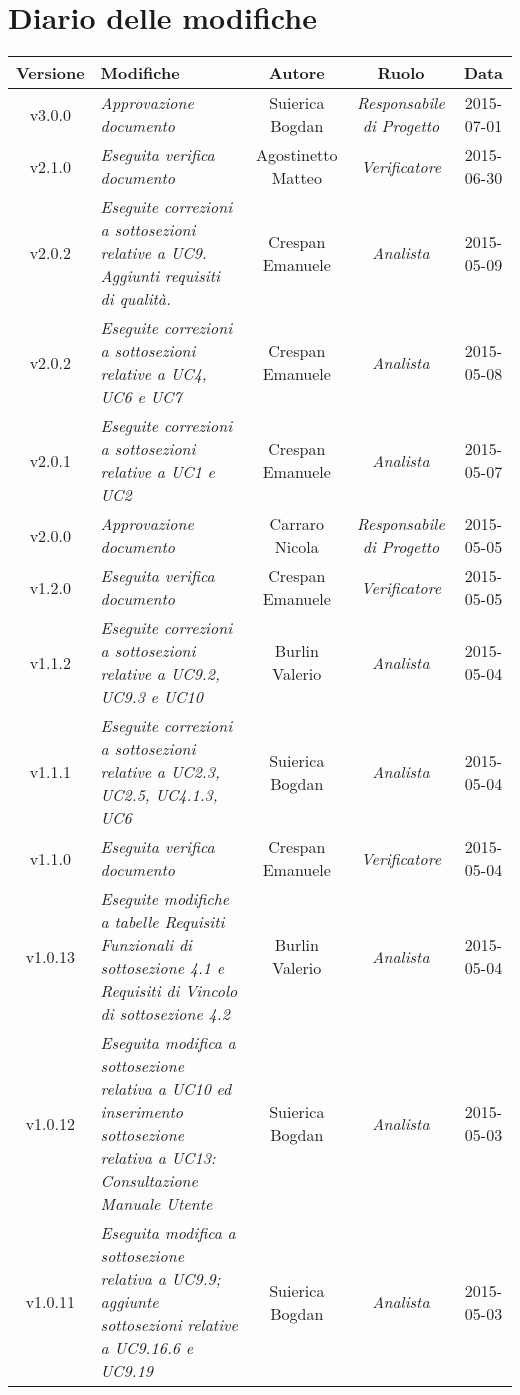 \newpage
\section*{Diario delle modifiche}

\begin{table}[h]
\centering
\begin{tabular}{|c|p{}|c|c|c|}
	\toprule
		\textbf{Versione} & \textbf{Modifiche} & \textbf{Autore} & \textbf{Ruolo} & \textbf{Data}\\
	\midrule
	\midrule

		v3.0.0 & \textit{Approvazione documento} & Suierica Bogdan & \textit{Responsabile di Progetto} & 2015-07-01 \\
	\midrule
		v2.1.0 & \textit{Eseguita verifica documento} & Agostinetto Matteo & \textit{Verificatore} & 2015-06-30 \\
	\midrule
		v2.0.2 & \textit{Eseguite correzioni a sottosezioni relative a UC9. Aggiunti requisiti di qualità.} & Crespan Emanuele & \textit{Analista} & 2015-05-09 \\
	\midrule
		v2.0.2 & \textit{Eseguite correzioni a sottosezioni relative a UC4, UC6 e UC7} & Crespan Emanuele & \textit{Analista} & 2015-05-08 \\
	\midrule
		v2.0.1 & \textit{Eseguite correzioni a sottosezioni relative a UC1 e UC2} & Crespan Emanuele & \textit{Analista} & 2015-05-07 \\
	\midrule
		v2.0.0 & \textit{Approvazione documento} & Carraro Nicola & \textit{Responsabile di Progetto} & 2015-05-05 \\
	\midrule
		v1.2.0 & \textit{Eseguita verifica documento} & Crespan Emanuele & \textit{Verificatore} & 2015-05-05 \\
	\midrule
		v1.1.2 & \textit{Eseguite correzioni a sottosezioni relative a UC9.2, UC9.3 e UC10} & Burlin Valerio & \textit{Analista} & 2015-05-04\\
	\midrule
		v1.1.1 & \textit{Eseguite correzioni a sottosezioni relative a UC2.3, UC2.5, UC4.1.3, UC6} & Suierica Bogdan & \textit{Analista} & 2015-05-04\\
	\midrule
		v1.1.0 & \textit{Eseguita verifica documento} & Crespan Emanuele & \textit{Verificatore} & 2015-05-04\\
	\midrule
		v1.0.13 & \textit{Eseguite modifiche a tabelle Requisiti Funzionali di sottosezione 4.1 e Requisiti di Vincolo di sottosezione 4.2} & Burlin Valerio & \textit{Analista} & 2015-05-04\\
	\midrule
		v1.0.12 & \textit{Eseguita modifica a sottosezione relativa a UC10 ed inserimento sottosezione relativa a UC13: Consultazione Manuale Utente} & Suierica Bogdan & \textit{Analista} & 2015-05-03\\
	\midrule
		v1.0.11 & \textit{Eseguita modifica a sottosezione relativa a UC9.9; aggiunte sottosezioni relative a UC9.16.6 e UC9.19} & Suierica Bogdan & \textit{Analista} & 2015-05-03\\

	\bottomrule
\end{tabular}
\end{table}
